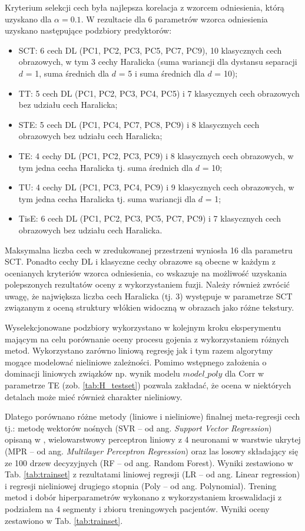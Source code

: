 Kryterium selekcji cech była najlepsza korelacja z wzorcem odniesienia, którą uzyskano dla $\alpha=0.1$. W rezultacie dla 6 parametrów wzorca odniesienia uzyskano następujące podzbiory predyktorów:  
\begin{itemize}
	\item SCT: 6 cech DL (PC1, PC2, PC3, PC5, PC7, PC9), 10 klasycznych cech obrazowych, w tym 3 cechy Haralicka (suma wariancji dla dystansu separacji $d$ = 1, suma średnich dla $d$ = 5 i suma średnich dla $d$ = 10);
	\item TT: 5 cech DL (PC1, PC2, PC3, PC4, PC5) i 7 klasycznych cech obrazowych bez udziału cech Haralicka;
	\item STE: 5 cech DL (PC1, PC4, PC7, PC8, PC9) i 8 klasycznych cech obrazowych bez udziału cech Haralicka;
	\item TE: 4 cechy DL (PC1, PC2, PC3, PC9) i 8 klasycznych cech obrazowych, w tym jedna cecha Haralicka tj. suma średnich dla $d$ = 10;
	\item TU: 4 cechy DL (PC1, PC3, PC4, PC9) i 9 klasycznych cech obrazowych, w tym jedna cecha Haralicka tj. suma wariancji dla $d$ = 1;  
	\item TisE: 6 cech DL (PC1, PC2, PC3, PC5, PC7, PC9) i 7 klasycznych cech obrazowych bez udziału cech Haralicka.
	
\end{itemize}
Maksymalna liczba cech w zredukowanej przestrzeni wyniosła 16 dla parametru SCT. Ponadto cechy DL i klasyczne cechy obrazowe są obecne w każdym z ocenianych kryteriów wzorca odniesienia, co wskazuje na możliwość uzyskania polepszonych rezultatów oceny z wykorzystaniem fuzji. Należy również zwrócić uwagę, że największa liczba cech Haralicka (tj. 3) występuje w parametrze SCT związanym z oceną struktury włókien widoczną w obrazach jako różne tekstury.

Wyselekcjonowane podzbiory wykorzystano w kolejnym kroku eksperymentu mającym na celu porównanie oceny procesu gojenia z wykorzystaniem różnych metod. Wykorzystano zarówno liniową regresję jak i tym razem algorytmy mogące modelować nieliniowe zależności. Pomimo wstępnego założenia o dominacji liniowych związków np. wynik modelu $model\_poly$ dla Corr w parametrze TE (zob. \ref{tab:H_testset}) pozwala zakładać, że ocena w niektórych detalach może mieć również charakter nieliniowy. 

Dlatego porównano różne metody (liniowe i nieliniowe) finalnej meta-regresji cech tj.: metodę wektorów nośnych (SVR -- od ang. \textit{Support Vector Regression}) opisaną w \cite{SVR_drucker}, wielowarstwowy perceptron liniowy z 4 neuronami w warstwie ukrytej (MPR -- od ang. \textit{Multilayer Perceptron Regression}) oraz las losowy składający się ze 100 drzew decyzyjnych (RF -- od ang. Random Forest). Wyniki zestawiono w Tab. \ref{tab:trainset} z rezultatami liniowej regresji (LR -- od ang. Linear regression) i regresji nieliniowej drugiego stopnia (Poly -- od ang. Polynomial). Trening metod i dobór hiperparametrów wykonano z wykorzystaniem kroswalidacji z podziałem na 4 segmenty i zbioru treningowych pacjentów. Wyniki oceny zestawiono w Tab. \ref{tab:trainset}.

